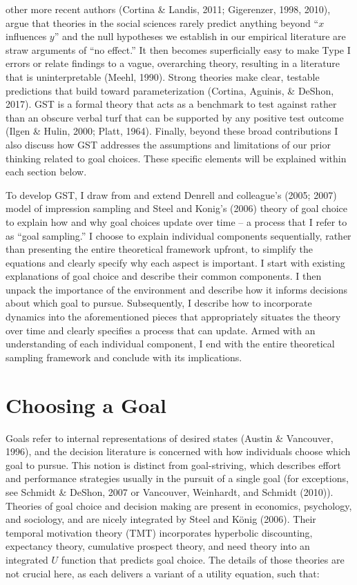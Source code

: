 \documentclass[english,man]{apa6}
\newcounter{author}
\theoremstyle{definition}
\theoremstyle{definition}
\theoremstyle{definition}
\theoremstyle{remark}
\begin{document}
other more recent authors (Cortina \& Landis, 2011; Gigerenzer, 1998,
2010), argue that theories in the social sciences rarely predict
anything beyond \enquote{\(x\) influences \(y\)} and the null hypotheses
we establish in our empirical literature are straw arguments of
\enquote{no effect.} It then becomes superficially easy to make Type I
errors or relate findings to a vague, overarching theory, resulting in a
literature that is uninterpretable (Meehl, 1990). Strong theories make
clear, testable predictions that build toward parameterization (Cortina,
Aguinis, \& DeShon, 2017). GST is a formal theory that acts as a
benchmark to test against rather than an obscure verbal turf that can be
supported by any positive test outcome (Ilgen \& Hulin, 2000; Platt,
1964). Finally, beyond these broad contributions I also discuss how GST
addresses the assumptions and limitations of our prior thinking related
to goal choices. These specific elements will be explained within each
section below.

To develop GST, I draw from and extend Denrell and colleague's (2005;
2007) model of impression sampling and Steel and Konig's (2006) theory
of goal choice to explain how and why goal choices update over time -- a
process that I refer to as \enquote{goal sampling.} I choose to explain
individual components sequentially, rather than presenting the entire
theoretical framework upfront, to simplify the equations and clearly
specify why each aspect is important. I start with existing explanations
of goal choice and describe their common components. I then unpack the
importance of the environment and describe how it informs decisions
about which goal to pursue. Subsequently, I describe how to incorporate
dynamics into the aforementioned pieces that appropriately situates the
theory over time and clearly specifies a process that can update. Armed
with an understanding of each individual component, I end with the
entire theoretical sampling framework and conclude with its
implications.

\section{Choosing a Goal}\label{choosing-a-goal}

Goals refer to internal representations of desired states (Austin \&
Vancouver, 1996), and the decision literature is concerned with how
individuals choose which goal to pursue. This notion is distinct from
goal-striving, which describes effort and performance strategies usually
in the pursuit of a single goal (for exceptions, see Schmidt \& DeShon,
2007 or Vancouver, Weinhardt, and Schmidt (2010)). Theories of goal
choice and decision making are present in economics, psychology, and
sociology, and are nicely integrated by Steel and König (2006). Their
temporal motivation theory (TMT) incorporates hyperbolic discounting,
expectancy theory, cumulative prospect theory, and need theory into an
integrated \(U\) function that predicts goal choice. The details of
those theories are not crucial here, as each delivers a variant of a
utility equation, such that:
\end{document}
